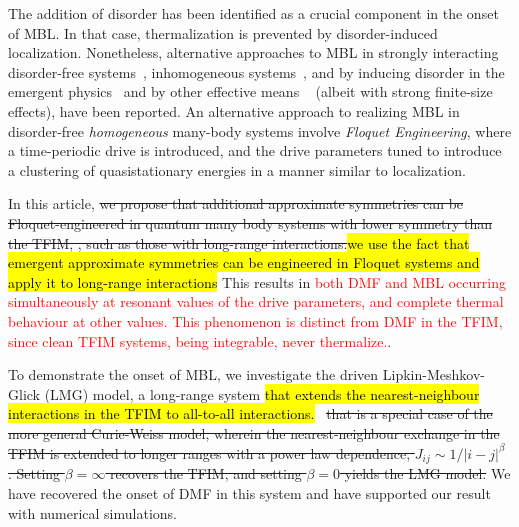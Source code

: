 \documentclass[%
reprint,
superscriptaddress,
linenumbers,
amsmath,amssymb,
aps,
prb,
showkeys,
]{revtex4-2}
\begin{document}
	The addition of disorder has been identified as a crucial component in the onset of MBL. In that case, thermalization is prevented by disorder-induced localization. Nonetheless, alternative approaches to MBL in strongly interacting disorder-free systems~\cite{diptiman2014, Carleo2012,aditya2023dynamical}, inhomogeneous systems~\cite{alessandro_markus, Grover2014,miles2015,Smith2017}, and by inducing disorder in the emergent physics~\cite{MBL_emergent_disorder} and by other effective means ~\cite{miles2015} (albeit with strong finite-size effects), have been reported. An alternative approach to realizing MBL in disorder-free \emph{homogeneous} many-body systems involve \textit{Floquet Engineering}, where a time-periodic drive is introduced, and the drive parameters tuned to introduce a clustering of quasistationary energies in a manner similar to localization\cite{zhang_floquet_2016}.

	
	In this article, \st{we propose that additional approximate symmetries can be Floquet-engineered in quantum many body systems with lower symmetry than the TFIM, , such as those with long-range interactions.}\hl{we use the fact that emergent approximate symmetries can be engineered in Floquet systems and apply it to long-range interactions} This results in \textcolor{red}{both DMF and MBL occurring simultaneously at resonant values of the drive parameters, and complete thermal behaviour at other values. This phenomenon is distinct from DMF in the TFIM, since clean TFIM systems, being integrable, never thermalize.}.
	
	
	To demonstrate the onset of MBL, we investigate the driven Lipkin-Meshkov-Glick (LMG) model\cite{lmg1965_1,lmg1965_2, lmg1965_3, ribeiro2008, debergh_2001,titum2020}, a long-range system \hl{that extends the nearest-neighbour interactions in the TFIM to  all-to-all interactions.}~\cite{campa_statistical_2009, eisele_multiple_1988, canning_class_1992}	\st{that is a special case of the more general Curie-Weiss model, wherein the nearest-neighbour exchange in the TFIM is extended to longer ranges with a power law dependence, ${J_{ij}\sim 1/|i-j|^\beta}$ . Setting $\beta=\infty$ recovers the TFIM, and setting $\beta=0$ yields the LMG model.} We have recovered the onset of DMF in this system and have supported our result with numerical simulations.
	
\end{document}
